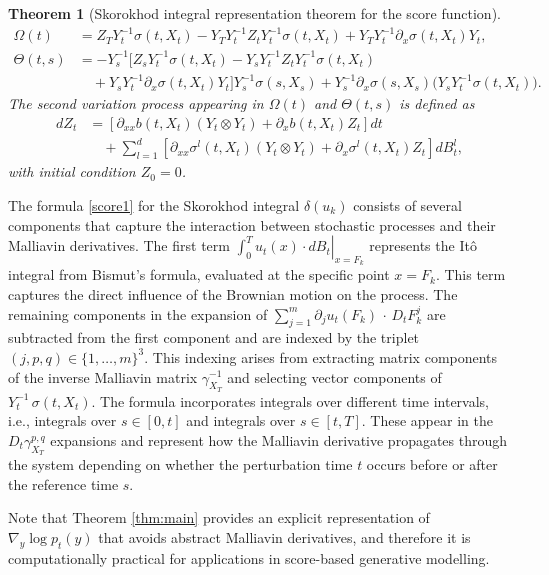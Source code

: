 \documentclass[]{interact}
\newcommand{\1}{\mathbf{1}}
\theoremstyle{plain}%
\newtheorem{theorem}{Theorem}[section]
\theoremstyle{definition}
\theoremstyle{remark}
\numberwithin{equation}{section}
\begin{document}
\begin{theorem}[Skorokhod integral representation theorem for the score function]

\begin{align*}
\Omega(t) &= Z_T Y_t^{-1} \sigma(t, X_t) - Y_T Y_t^{-1} Z_t Y_t^{-1} \sigma(t, X_t) + Y_T Y_t^{-1} \partial_x \sigma(t, X_t) Y_t, \\[0.5em]
\Theta(t,s) &= -Y_s^{-1} \bigg[ Z_s Y_t^{-1} \sigma(t, X_t) - Y_s Y_t^{-1} Z_t Y_t^{-1} \sigma(t, X_t) \\
&\quad + Y_s Y_t^{-1} \partial_x \sigma(t, X_t) Y_t \bigg] Y_s^{-1} \sigma(s, X_s) + Y_s^{-1} \partial_x \sigma(s, X_s) \bigg(Y_s Y_t^{-1} \sigma(t, X_t) \bigg).
\end{align*}
The second variation process appearing in $\Omega(t)$ and $\Theta(t,s)$ is defined as
\begin{align*}
dZ_t &= \left[ \partial_{xx} b(t, X_t) (Y_t \otimes Y_t) + \partial_x b(t, X_t) Z_t \right] dt \\
&\quad + \sum_{l=1}^d \left[ \partial_{xx} \sigma^l(t, X_t) (Y_t \otimes Y_t) + \partial_x \sigma^l(t, X_t) Z_t \right] dB_t^l,
\end{align*}
with initial condition \( Z_0 = 0 \).
\end{theorem}

\noindent
The formula \eqref{score1} for the Skorokhod integral $\delta(u_k)$ consists of several components that capture the interaction between stochastic processes and their Malliavin derivatives. The first term $\left. \int_0^T u_t(x) \cdot dB_t \right|_{x=F_k}$ represents the It\^o integral from Bismut's formula, evaluated at the specific point $x = F_k$. This term captures the direct influence of the Brownian motion on the process. The remaining components in the expansion of $\sum_{j=1}^m \partial_j u_t(F_k)\,\cdot\,D_t F_k^j$ are subtracted from the first component and are indexed by the triplet $(j,p,q) \in \{1,\ldots,m\}^3$. This indexing arises from extracting matrix components of the inverse Malliavin matrix $\gamma_{X_T}^{-1}$ and selecting vector components of $Y_t^{-1}\,\sigma(t,X_t)$. The formula incorporates integrals over different time intervals, i.e., integrals over $s \in [0,t]$ and integrals over $s \in [t,T]$. These appear in the $D_t\gamma_{X_T}^{p,q}$ expansions and represent how the Malliavin derivative propagates through the system depending on whether the perturbation time $t$ occurs before or after the reference time $s$.

Note that Theorem \ref{thm:main} provides an explicit representation of \(\nabla_y \log p_t(y)\) that avoids abstract Malliavin derivatives, and therefore it is computationally practical for applications in score-based generative modelling. 
\end{document}
